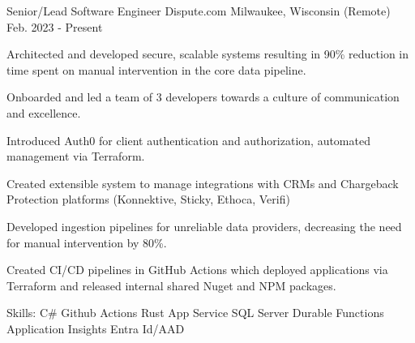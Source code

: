 

\begin{cventries}

  \cventry
    {Senior/Lead Software Engineer} %
    {Dispute.com} %
    {Milwaukee, Wisconsin (Remote)} %
    {Feb. 2023 - Present} %
    {
      \begin{cvitems} %
        \item {Architected and developed secure, scalable systems resulting in 90\% reduction in time spent on 
                manual intervention in the core data pipeline.}
        \item {Onboarded and led a team of 3 developers towards a culture of communication and excellence.}
        \item {Introduced Auth0 for client authentication and authorization, automated management via Terraform.}
        \item {Created extensible system to manage integrations with CRMs and Chargeback Protection platforms (Konnektive, Sticky, Ethoca, Verifi)}
        \item {Developed ingestion pipelines for unreliable data providers, decreasing the need for manual intervention by 80\%.}
        \item {Created CI/CD pipelines in GitHub Actions which deployed applications via Terraform and released internal shared Nuget and NPM packages.}
        \item {Skills: C\# \textbullet{} Github Actions \textbullet{} Rust \textbullet{} App Service \textbullet{} SQL Server \textbullet{} Durable Functions \textbullet{} Application Insights \textbullet{} Entra Id/AAD}
      \end{cvitems}
    }


\end{cventries}
